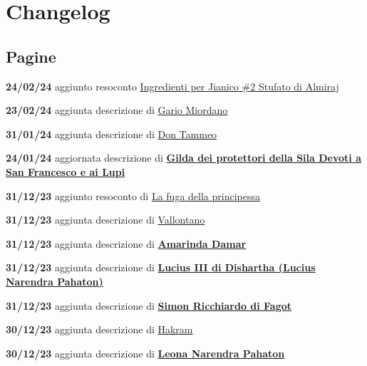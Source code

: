 \section{Changelog}\label{changelog}

\subsection{Pagine}\label{pagine}

\textbf{24/02/24} aggiunto resoconto
\href{Ingredienti\%20per\%20Jianico\%20\#2\%20Stufato\%20di\%20Almiraj\%20372037b133534205abf685f4acf5371b.md}{Ingredienti
per Jianico \#2 Stufato di Almiraj}

\textbf{23/02/24} aggiunta descrizione di
\href{Gario\%20Miordano\%20e4415ce5ce8d4e8a834479901942d838.md}{Gario
Miordano}

\textbf{31/01/24} aggiunta descrizione di
\href{Don\%20Tammeo\%20a1f5f975f79d47b79b4639e0711a4db9.md}{Don Tammeo}

\textbf{24/01/24} aggiornata descrizione di
\href{Gilda\%20dei\%20protettori\%20della\%20Sila\%20Devoti\%20a\%20San\%20Franc\%20e29bb7909af24fee931336355db913d4.md}{\textbf{Gilda
dei protettori della Sila Devoti a San Francesco e ai Lupi}}

\textbf{31/12/23} aggiunto resoconto di
\href{La\%20fuga\%20della\%20principessa\%20c44c26ec45744545854e65a85381d482.md}{La
fuga della principessa}

\textbf{31/12/23} aggiunta descrizione di
\href{Vallontano\%20c4bbe07d1dda45fa9cf25e42ac530b18.md}{Vallontano}

\textbf{31/12/23} aggiunta descrizione di
\href{Amarinda\%20Damar\%20908c2f67ba8e4469b8757c86ca5cbbdf.md}{\textbf{Amarinda
Damar}}

\textbf{31/12/23} aggiunta descrizione di
\href{Lucius\%20III\%20di\%20Dishartha\%20(Lucius\%20Narendra\%20Pahaton)\%206282e81aaf47447dbce8e889b62bb9d8.md}{\textbf{Lucius
III di Dishartha (Lucius Narendra Pahaton)}}

\textbf{31/12/23} aggiunta descrizione di
\textbf{\href{Simon\%20Ricchiardo\%20di\%20Fagot\%2015741feb58ac4134bd2d02f5458ca0f0.md}{\textbf{Simon
Ricchiardo di Fagot}}}

\textbf{30/12/23} aggiunta descrizione di
\href{Hakram\%20e1dbfd75d26747d59333b4e28dc27cea.md}{Hakram}

\textbf{30/12/23} aggiunta descrizione di
\href{Leona\%20Narendra\%20Pahaton\%2038ff8efbf9ce44f1bb7f0e417369ab34.md}{\textbf{Leona
Narendra Pahaton}}

